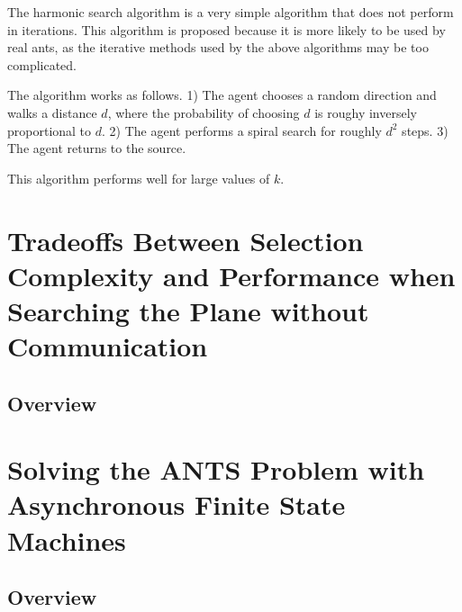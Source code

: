 \documentclass[11pt]{article}
\begin{document}
The harmonic search algorithm is a very simple algorithm that does not perform in iterations. This algorithm is proposed because it is more likely to be used by real ants, as the iterative methods used by the above algorithms may be too complicated.

The algorithm works as follows. 1) The agent chooses a random direction and walks a distance $d$, where the probability of choosing $d$ is roughy inversely proportional to $d$. 2) The agent performs a spiral search for roughly $d^2$ steps. 3) The agent returns to the source.

This algorithm performs well for large values of $k$.


\section{Tradeoffs Between Selection Complexity and Performance when Searching the Plane without Communication}

\subsection{Overview}

\section{Solving the ANTS Problem with Asynchronous Finite State Machines}

\subsection{Overview}
\end{document}
